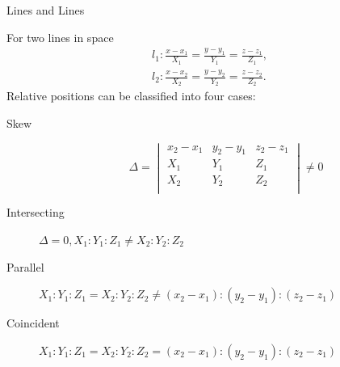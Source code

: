 \documentclass[11pt]{../../TexTemplate/elegantbook} %
\begin{document}
\begin{leftbarTitle}{Lines and Lines}\end{leftbarTitle}
For two lines in space
\begin{gather*}
    l_{1}: \frac{x - x_{1}}{X_{1}} = \frac{y - y_{1}}{Y_{1}} = \frac{z - z_{1}}{Z_{1}}, \\
    l_{2}: \frac{x - x_{2}}{X_{2}} = \frac{y - y_{2}}{Y_{2}} = \frac{z - z_{2}}{Z_{2}}.
\end{gather*}
Relative positions can be classified into four cases:
\begin{description}
    \item[Skew] 
    \[\Delta = \begin{vmatrix}
        x_{2} - x_{1} & y_{2} - y_{1} & z_{2} - z_{1} \\
        X_{1} & Y_{1} & Z_{1} \\
        X_{2} & Y_{2} & Z_{2} \\
    \end{vmatrix} \neq 0
    \]
    \item[Intersecting] \(\Delta = 0, X_{1}:Y_{1}:Z_{1}\neq X_{2}:Y_{2}:Z_{2}\)
    \item[Parallel] \(X_{1}:Y_{1}:Z_{1} = X_{2}:Y_{2}:Z_{2} \neq (x_{2}-x_{1}): (y_{2}-y_{1}): (z_{2}-z_{1})\)
    \item[Coincident] \(X_{1}:Y_{1}:Z_{1} = X_{2}:Y_{2}:Z_{2} = (x_{2}-x_{1}): (y_{2}-y_{1}): (z_{2}-z_{1})\)
\end{description}
\end{document}
